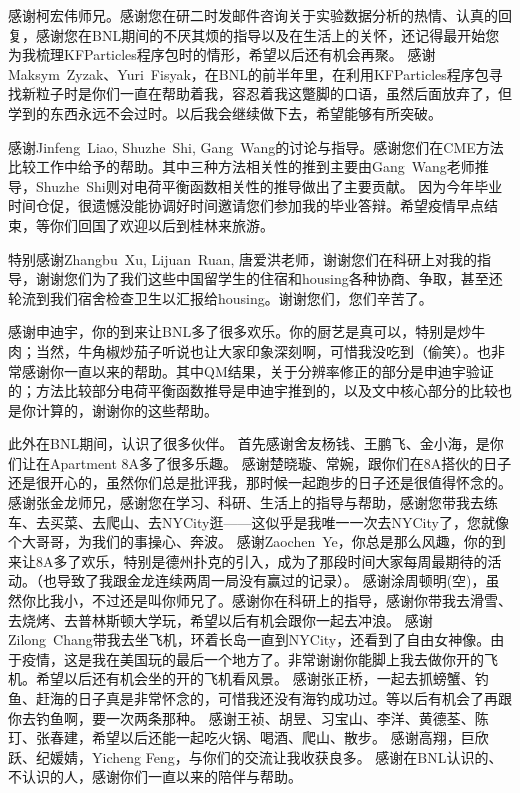 感谢柯宏伟师兄。感谢您在研二时发邮件咨询关于实验数据分析的热情、认真的回复，感谢您在BNL期间的不厌其烦的指导以及在生活上的关怀，还记得最开始您为我梳理KFParticles程序包时的情形，希望以后还有机会再聚。
感谢Maksym~Zyzak、Yuri~Fisyak，在BNL的前半年里，在利用KFParticles程序包寻找新粒子时是你们一直在帮助着我，容忍着我这蹩脚的口语，虽然后面放弃了，但学到的东西永远不会过时。以后我会继续做下去，希望能够有所突破。

感谢Jinfeng~Liao, Shuzhe~Shi, Gang~Wang的讨论与指导。感谢您们在CME方法比较工作中给予的帮助。其中三种方法相关性的推到主要由Gang~Wang老师推导，Shuzhe~Shi则对电荷平衡函数相关性的推导做出了主要贡献。
因为今年毕业时间仓促，很遗憾没能协调好时间邀请您们参加我的毕业答辩。希望疫情早点结束，等你们回国了欢迎以后到桂林来旅游。


特别感谢Zhangbu~Xu, Lijuan~Ruan, 唐爱洪老师，谢谢您们在科研上对我的指导，谢谢您们为了我们这些中国留学生的住宿和housing各种协商、争取，甚至还轮流到我们宿舍检查卫生以汇报给housing。谢谢您们，您们辛苦了。

感谢申迪宇，你的到来让BNL多了很多欢乐。你的厨艺是真可以，特别是炒牛肉；当然，牛角椒炒茄子听说也让大家印象深刻啊，可惜我没吃到（偷笑）。也非常感谢你一直以来的帮助。其中QM结果，关于分辨率修正的部分是申迪宇验证的；方法比较部分电荷平衡函数推导是申迪宇推到的，以及文中核心部分的比较也是你计算的，谢谢你的这些帮助。


此外在BNL期间，认识了很多伙伴。
首先感谢舍友杨钱、王鹏飞、金小海，是你们让在Apartment 8A多了很多乐趣。
感谢楚晓璇、常婉，跟你们在8A搭伙的日子还是很开心的，虽然你们总是批评我，那时候一起跑步的日子还是很值得怀念的。
感谢张金龙师兄，感谢您在学习、科研、生活上的指导与帮助，感谢您带我去练车、去买菜、去爬山、去NYCity逛——这似乎是我唯一一次去NYCity了，您就像个大哥哥，为我们的事操心、奔波。
感谢Zaochen~Ye，你总是那么风趣，你的到来让8A多了欢乐，特别是德州扑克的引入，成为了那段时间大家每周最期待的活动。（也导致了我跟金龙连续两周一局没有赢过的记录）。
感谢涂周顿明(空)，虽然你比我小，不过还是叫你师兄了。感谢你在科研上的指导，感谢你带我去滑雪、去烧烤、去普林斯顿大学玩，希望以后有机会跟你一起去冲浪。
感谢Zilong~Chang带我去坐飞机，环着长岛一直到NYCity，还看到了自由女神像。由于疫情，这是我在美国玩的最后一个地方了。非常谢谢你能脚上我去做你开的飞机。希望以后还有机会坐的开的飞机看风景。
感谢张正桥，一起去抓螃蟹、钓鱼、赶海的日子真是非常怀念的，可惜我还没有海钓成功过。等以后有机会了再跟你去钓鱼啊，要一次两条那种。
感谢王祯、胡昱、习宝山、李洋、黄德荃、陈玎、张春建，希望以后还能一起吃火锅、喝酒、爬山、散步。
感谢高翔，巨欣跃、纪媛婧，Yicheng Feng，与你们的交流让我收获良多。
感谢在BNL认识的、不认识的人，感谢你们一直以来的陪伴与帮助。

